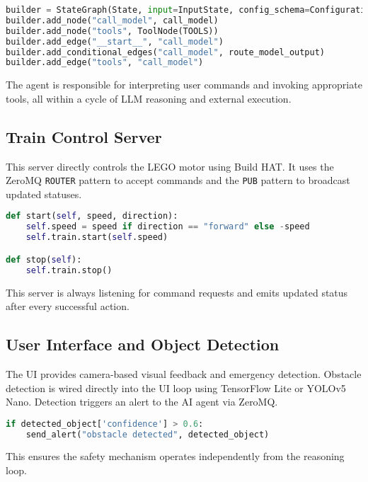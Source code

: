 \begin{lstlisting}[language=Python, caption=LangGraph reasoning node setup]
builder = StateGraph(State, input=InputState, config_schema=Configuration)
builder.add_node("call_model", call_model)
builder.add_node("tools", ToolNode(TOOLS))
builder.add_edge("__start__", "call_model")
builder.add_conditional_edges("call_model", route_model_output)
builder.add_edge("tools", "call_model")
\end{lstlisting}

The agent is responsible for interpreting user commands and invoking appropriate tools, all within a cycle of LLM reasoning and external execution.

\subsection{Train Control Server}

This server directly controls the LEGO motor using Build HAT. It uses the ZeroMQ \texttt{ROUTER} pattern to accept commands and the \texttt{PUB} pattern to broadcast updated statuses.

\begin{lstlisting}[language=Python, caption=Motor control interface]
def start(self, speed, direction):
    self.speed = speed if direction == "forward" else -speed
    self.train.start(self.speed)

def stop(self):
    self.train.stop()
\end{lstlisting}

This server is always listening for command requests and emits updated status after every successful action.

\subsection{User Interface and Object Detection}

The UI provides camera-based visual feedback and emergency detection. Obstacle detection is wired directly into the UI loop using TensorFlow Lite or YOLOv5 Nano. Detection triggers an alert to the AI agent via ZeroMQ.

\begin{lstlisting}[language=Python, caption=Triggering alerts from UI]
if detected_object['confidence'] > 0.6:
    send_alert("obstacle detected", detected_object)
\end{lstlisting}

This ensures the safety mechanism operates independently from the reasoning loop.


